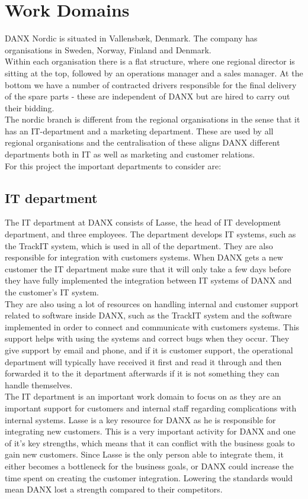\section{Work Domains}
DANX Nordic is situated in Vallensbæk, Denmark. The company has organisations in Sweden, Norway, Finland and Denmark.\\
Within each organisation there is a flat structure\cite{gert028}, where one regional director is sitting at the top, followed by an operations manager and a sales manager. At the bottom we have a number of contracted drivers responsible for the final delivery of the spare parts \cite{gert022}\cite{malene002} - these are independent of DANX but are hired to carry out their bidding.\\
The nordic branch is different from the regional organisations in the sense that it has an IT-department and a marketing department. These are used by all regional organisations and the centralisation of these aligns DANX different departments both in IT as well as marketing and customer relations.\\
For this project the important departments to consider are:

\subsection{IT department}
The IT department at DANX consists of Lasse, the head of IT development department\cite{lasse014}, and three employees. The department develops IT systems, such as the TrackIT system\cite{lasse015}, which is used in all of the department. They are also responsible for integration with customers systems. When DANX gets a new customer the IT department make sure that it will only take a few days before they have fully implemented the integration between IT systems of DANX and the customer’s IT system.\cite{lasse008}\\
They are also using a lot of resources on handling internal and customer support related to software inside DANX\cite{lasse016}, such as the TrackIT system and the software implemented in order to connect and communicate with customers systems. This support helps with using the systems and correct bugs when they occur. They give support by email and phone, and if it is customer support, the operational department will typically have received it first and read it through and then forwarded it to the it department afterwards\cite{lasse001} if it is not something they can handle themselves.\cite{lasse017} \\
The IT department is an important work domain to focus on as they are an important support for customers and internal staff regarding complications with internal systems. Lasse is a key resource for DANX as he is responsible for integrating new customers.\cite{lasse018} This is a very important activity for DANX and one of it’s key strengths, which means that it can conflict with the business goals to gain new customers. Since Lasse is the only person able to integrate them, it either becomes a bottleneck for the business goals, or DANX could increase the time spent on creating the customer integration. Lowering the standards would mean DANX lost a strength compared to their competitors.

